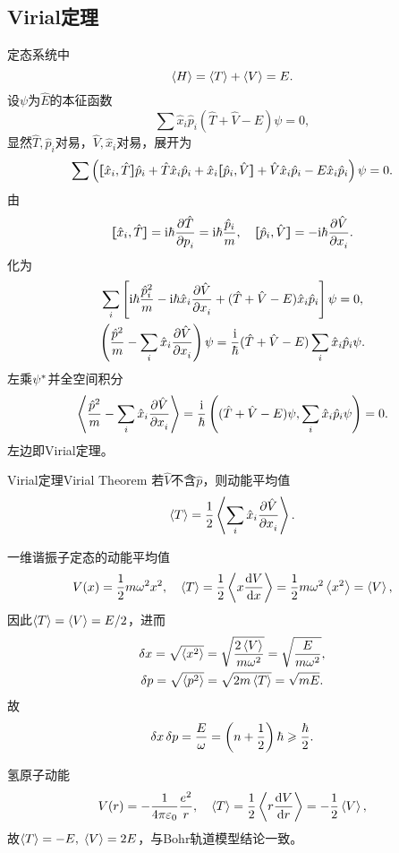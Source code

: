 \subsection{Virial定理}
定态系统中
\[
	\left\langle H\right\rangle=\left\langle T\right\rangle+\left\langle V\right\rangle=E.
\]
设$\psi$为$\hat E$的本征函数
\[
	\sum\hat x_i\hat p_i(\hat T+\hat V-E)\psi=0,
\]
显然$\hat T,\hat p_i$对易，$\hat V,\hat x_i$对易，展开为
\[
	\sum \left(\lfloor\hspace{-4.7 pt}\lceil \hat x_i,\hat T\rceil\hspace{-4.7 pt}\rfloor\hat p_i+\hat T\hat x_i\hat p_i+\hat x_i\lfloor\hspace{-4.7 pt}\lceil \hat p_i,\hat V\rceil\hspace{-4.7 pt}\rfloor+\hat V\hat x_i\hat p_i-E\hat x_i\hat p_i\right)\psi=0.
\]
由
\[
	\cmm{x_i}T=\i\hbar\pv{\hat T}{p_i}=\i\hbar\frac{\hat p_i}m,\quad \cmm{p_i}V=-\i\hbar\pv{\hat V}{x_i}.
\]
化为
\begin{gather*}
	\sum_i\fkh{\i\hbar\frac{\hat p_i^2}m-\i\hbar\hat x_i\pv{\hat V}{x_i}+(\hat T+\hat V-E)\hat x_i\hat p_i}\psi=0,\\
	\kh{\frac{\hat p^2}m-\sum_i\hat x_i\pv{\hat V}{x_i}}\psi=\frac\i\hbar(\hat T+\hat V-E)\sum_i\hat x_i\hat p_i\psi.
\end{gather*}
左乘$\psi^\ast$并全空间积分
\[
	\left\langle \frac{\hat p^2}m-\sum_i\hat x_i\frac{\partial^{\;\!\!}\hat V}{\partial x_i^{\;\!\!}}\right\rangle=\frac{\mathrm{i}}\hbar\left((\hat T+\hat V-E)\psi,\sum_i\hat x_i\hat p_i\psi\right)=0.
\]
左边即Virial定理。
\begin{theorem}{Virial定理}{Virial Theorem}
	若$\hat V$不含$\hat p$，则动能平均值
	\begin{align}
		\left\langle T\right\rangle=\frac12\left\langle \sum_i\hat x_i\frac{\partial^{\;\!\!}\hat V}{\partial x_i^{\;\!\!}}\right\rangle.
	\end{align}
\end{theorem}
\begin{example}{一维谐振子定态的动能平均值}{}
	\[
		V(x)=\frac12m\omega^2x^2,\quad\left\langle T\right\rangle=\frac12\left\langle x\frac{\mathrm{d}^{\;\!\!}V}{\mathrm{d} x^{\;\!\!}}\right\rangle=\frac12m\omega^2\left\langle x^2\right\rangle=\left\langle V\right\rangle,
	\]
	因此$\left\langle T\right\rangle=\left\langle V\right\rangle=E/2$，进而
	\begin{gather*}
		\delta x=\sqrt{\left\langle x^2\right\rangle}=\sqrt{\frac{2\left\langle V\right\rangle}{m\omega^2}}=\sqrt{\frac E{m\omega^2}},\\
		\delta p=\sqrt{\left\langle p^2\right\rangle}=\sqrt{2m\left\langle T\right\rangle}=\sqrt{mE}.
	\end{gather*}
	故
	\[
		\delta x\,\delta p=\frac E\omega=\left(n+\frac12\right)\hbar\geqslant\frac\hbar{2}.
	\]
\end{example}
\begin{example}{氢原子动能}{}
	\[
		V(r)=-\frac1{4\pi\varepsilon_0}\frac{e^2}r,\quad\left\langle T\right\rangle=\frac12\left\langle r\frac{\mathrm{d}^{\;\!\!}V}{\mathrm{d} r^{\;\!\!}}\right\rangle=-\frac12\left\langle V\right\rangle,
	\]
	故$\left\langle T\right\rangle=-E,\;\left\langle V\right\rangle=2E$，与Bohr轨道模型结论一致。
\end{example}
